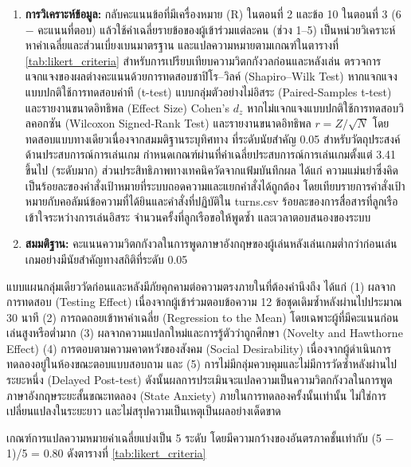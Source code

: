 \begin{enumerate}[label=\arabic*)]
    \item \textbf{การวิเคราะห์ข้อมูล:} กลับคะแนนข้อที่มีเครื่องหมาย (R) ในตอนที่ 2 และข้อ 10 ในตอนที่ 3 (6 $-$ คะแนนที่ตอบ) แล้วใช้ค่าเฉลี่ยรายข้อของผู้เข้าร่วมแต่ละคน (ช่วง 1--5) เป็นหน่วยวิเคราะห์ หาค่าเฉลี่ยและส่วนเบี่ยงเบนมาตรฐาน และแปลความหมายตามเกณฑ์ในตารางที่ \ref{tab:likert_criteria} สำหรับการเปรียบเทียบความวิตกกังวลก่อนและหลังเล่น ตรวจการแจกแจงของผลต่างคะแนนด้วยการทดสอบชาปิโร--วิลค์ (Shapiro--Wilk Test) หากแจกแจงแบบปกติใช้การทดสอบค่าที (t-test) แบบกลุ่มตัวอย่างไม่อิสระ (Paired-Samples t-test) และรายงานขนาดอิทธิพล (Effect Size) Cohen's $d_z$ หากไม่แจกแจงแบบปกติใช้การทดสอบวิลคอกซัน (Wilcoxon Signed-Rank Test) และรายงานขนาดอิทธิพล $r = Z/\sqrt{N}$ โดยทดสอบแบบทางเดียวเนื่องจากสมมติฐานระบุทิศทาง ที่ระดับนัยสำคัญ 0.05 สำหรับวัตถุประสงค์ด้านประสบการณ์การเล่นเกม กำหนดเกณฑ์ผ่านที่ค่าเฉลี่ยประสบการณ์การเล่นเกมตั้งแต่ 3.41 ขึ้นไป (ระดับมาก) ส่วนประสิทธิภาพทางเทคนิควัดจากแฟ้มบันทึกผล ได้แก่ ความแม่นยำซึ่งคิดเป็นร้อยละของคำสั่งเป้าหมายที่ระบบถอดความและแยกคำสั่งได้ถูกต้อง โดยเทียบรายการคำสั่งเป้าหมายกับคอลัมน์ข้อความที่ได้ยินและคำสั่งที่ปฏิบัติใน turns.csv ร้อยละของการสื่อสารที่ลูกเรือเข้าใจระหว่างการเล่นอิสระ จำนวนครั้งที่ลูกเรือขอให้พูดซ้ำ และเวลาตอบสนองของระบบ
    \item \textbf{สมมติฐาน:} คะแนนความวิตกกังวลในการพูดภาษาอังกฤษของผู้เล่นหลังเล่นเกมต่ำกว่าก่อนเล่นเกมอย่างมีนัยสำคัญทางสถิติที่ระดับ 0.05
\end{enumerate}

แบบแผนกลุ่มเดียววัดก่อนและหลังมีภัยคุกคามต่อความตรงภายในที่ต้องคำนึงถึง ได้แก่ (1) ผลจากการทดสอบ (Testing Effect) เนื่องจากผู้เข้าร่วมตอบข้อความ 12 ข้อชุดเดิมซ้ำหลังผ่านไปประมาณ 30 นาที (2) การถดถอยเข้าหาค่าเฉลี่ย (Regression to the Mean) โดยเฉพาะผู้ที่มีคะแนนก่อนเล่นสูงหรือต่ำมาก (3) ผลจากความแปลกใหม่และการรู้ตัวว่าถูกศึกษา (Novelty and Hawthorne Effect) (4) การตอบตามความคาดหวังของสังคม (Social Desirability) เนื่องจากผู้ดำเนินการทดลองอยู่ในห้องขณะตอบแบบสอบถาม และ (5) การไม่มีกลุ่มควบคุมและไม่มีการวัดซ้ำหลังผ่านไประยะหนึ่ง (Delayed Post-test) ดังนั้นผลการประเมินจะแปลความเป็นความวิตกกังวลในการพูดภาษาอังกฤษระยะสั้นขณะทดลอง (State Anxiety) ภายในการทดลองครั้งนั้นเท่านั้น ไม่ใช่การเปลี่ยนแปลงในระยะยาว และไม่สรุปความเป็นเหตุเป็นผลอย่างเด็ดขาด

เกณฑ์การแปลความหมายค่าเฉลี่ยแบ่งเป็น 5 ระดับ โดยมีความกว้างของอันตรภาคชั้นเท่ากับ (5 $-$ 1)/5 = 0.80 ดังตารางที่ \ref{tab:likert_criteria}

